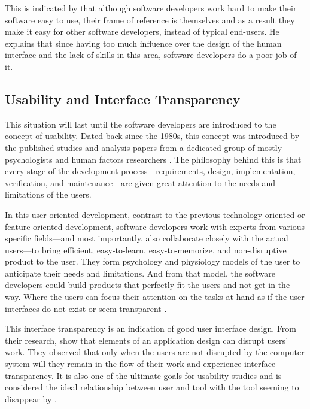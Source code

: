 \documentclass[a4paper,titlepage]{article}
\begin{document}
This is indicated by \citet{inmates:cooper} that although software
developers work hard to make their software easy to use, their frame
of reference is themselves and as a result they make it easy for other
software developers, instead of typical end-users. He explains that
since having too much influence over the design of the human interface
and the lack of skills in this area, software developers do a poor job
of it.

\subsection{Usability and Interface Transparency}
This situation will last until the software developers are introduced
to the concept of usability. Dated back since the 1980s, this concept
was introduced by the published studies and analysis papers from a
dedicated group of mostly psychologists and human factors researchers
\citep{human:rubinstein, friendly:simpson, human:shneiderman,
  human:brown, software:dumas}. The philosophy behind this is that
every stage of the development process---requirements, design,
implementation, verification, and maintenance---are given great
attention to the needs and limitations of the users.

In this user-oriented development, contrast to the previous
technology-oriented or feature-oriented development, software
developers work with experts from various specific fields---and most
importantly, also collaborate closely with the actual users---to bring
efficient, easy-to-learn, easy-to-memorize, and non-disruptive product
to the user. They form psychology and physiology models of the user to
anticipate their needs and limitations. And from that model, the
software developers could build products that perfectly fit the users
and not get in the way. Where the users can focus their attention on
the tasks at hand as if the user interfaces do not exist or seem
transparent \citep{computer:weiser}.

This interface transparency is an indication of good user interface
design. From their research, \citet{transparency:holtzblatt} show that
elements of an application design can disrupt users' work. They
observed that only when the users are not disrupted by the computer
system will they remain in the flow of their work and experience
interface transparency. It is also one of the ultimate goals for
usability studies and is considered the ideal relationship between
user and tool with the tool seeming to disappear by
\citet{transparency:rutkoski}.
\end{document}
